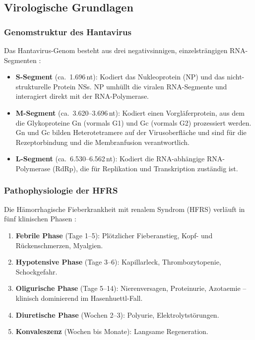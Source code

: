 ﻿\documentclass[a4paper,12pt]{article}
\theoremstyle{definition}
\begin{document}
\subsection{Virologische Grundlagen}

\subsubsection{Genomstruktur des Hantavirus}

Das Hantavirus-Genom besteht aus drei negativsinnigen, einzelstr\"angigen
RNA-Segmenten \cite{Nichol2005}:

\begin{itemize}
    \item \textbf{S-Segment} (ca.\ 1.696\,nt): Kodiert das Nukleoprotein (NP) und
          das nicht-strukturelle Protein NSs. NP umh\"ullt die viralen RNA-Segmente
          und interagiert direkt mit der RNA-Polymerase.
    \item \textbf{M-Segment} (ca.\ 3.620--3.696\,nt): Kodiert einen Vorgl\"aferprotein,
          aus dem die Glykoproteine Gn (vormals G1) und Gc (vormals G2) prozessiert
          werden. Gn und Gc bilden Heterotetramere auf der Virusoberfl\"ache und
          sind f\"ur die Rezeptorbindung und die Membranfusion verantwortlich.
    \item \textbf{L-Segment} (ca.\ 6.530--6.562\,nt): Kodiert die RNA-abh\"angige
          RNA-Polymerase (RdRp), die f\"ur Replikation und Transkription zust\"andig ist.
\end{itemize}

\subsubsection{Pathophysiologie der HFRS}

Die H\"amorrhagische Fieberkrankheit mit renalem Syndrom (HFRS) verl\"auft
in f\"unf klinischen Phasen \cite{Vapalahti2003}:
\begin{enumerate}
    \item \textbf{Febrile Phase} (Tage 1--5): Pl\"otzlicher Fieberanstieg,
          Kopf- und R\"uckenschmerzen, Myalgien.
    \item \textbf{Hypotensive Phase} (Tage 3--6): Kapillarleck,
          Thrombozytopenie, Schockgefahr.
    \item \textbf{Oligurische Phase} (Tage 5--14): Nierenversagen,
          Proteinurie, Azotaemie -- klinisch dominierend im Hasenhuettl-Fall.
    \item \textbf{Diuretische Phase} (Wochen 2--3): Polyurie, Elektrolytst\"orungen.
    \item \textbf{Konvaleszenz} (Wochen bis Monate): Langsame Regeneration.
\end{enumerate}
\end{document}
